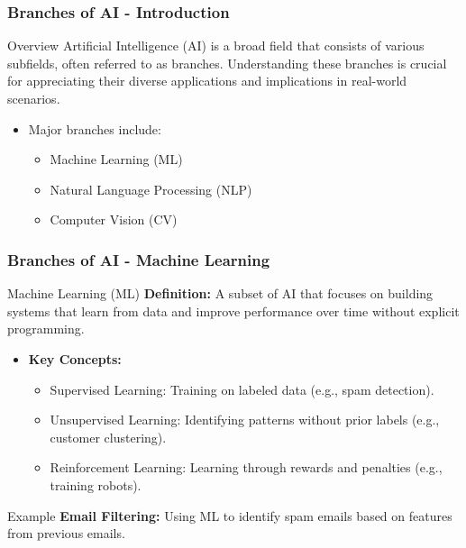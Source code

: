 \documentclass[aspectratio=169]{beamer}
\begin{document}
\begin{frame}[fragile]
    \frametitle{Branches of AI - Introduction}
    \begin{block}{Overview}
        Artificial Intelligence (AI) is a broad field that consists of various subfields, often referred to as branches. Understanding these branches is crucial for appreciating their diverse applications and implications in real-world scenarios.
    \end{block}
    
    \begin{itemize}
        \item Major branches include:
        \begin{itemize}
            \item Machine Learning (ML)
            \item Natural Language Processing (NLP)
            \item Computer Vision (CV)
        \end{itemize}
    \end{itemize}
\end{frame}

\begin{frame}[fragile]
    \frametitle{Branches of AI - Machine Learning}
    \begin{block}{Machine Learning (ML)}
        \textbf{Definition:} A subset of AI that focuses on building systems that learn from data and improve performance over time without explicit programming.
    \end{block}
    
    \begin{itemize}
        \item \textbf{Key Concepts:}
        \begin{itemize}
            \item Supervised Learning: Training on labeled data (e.g., spam detection).
            \item Unsupervised Learning: Identifying patterns without prior labels (e.g., customer clustering).
            \item Reinforcement Learning: Learning through rewards and penalties (e.g., training robots).
        \end{itemize}
    \end{itemize}

    \begin{block}{Example}
        \textbf{Email Filtering:} Using ML to identify spam emails based on features from previous emails.
    \end{block}
\end{frame}
\end{document}
